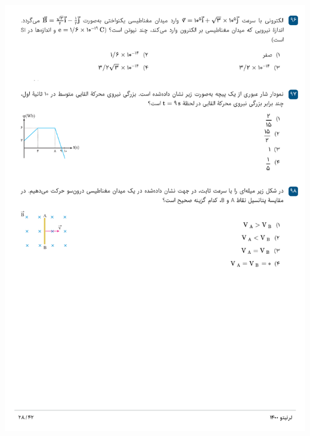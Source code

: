 \documentclass{book}
\begin{document}
\includegraphics[width=\textwidth]{"pages/28"}
\end{document}
